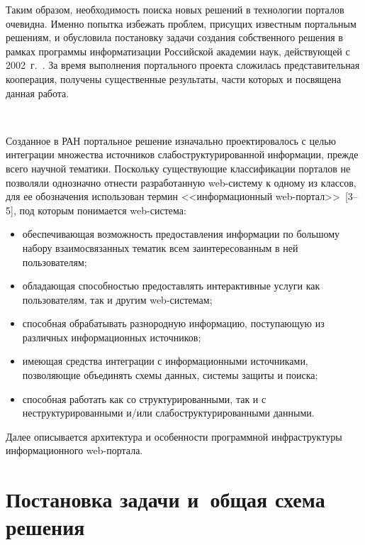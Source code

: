 \begin{multicols}{2}
 Таким образом, необходимость поиска новых решений в технологии порталов
очевидна. Именно попытка избежать проблем, присущих известным портальным
решениям, и обусловила постановку задачи создания собственного решения в рамках
программы информатизации Российской академии наук, действующей с
2002~г.~\cite{3bos}. За время выполнения портального проекта сложилась
представительная кооперация, получены существенные результаты, части которых и
посвящена данная работа.

 \begin{figure*} %
 \vspace*{1pt}
\begin{center}
\mbox{%
\epsfxsize=158.529mm
}
\end{center}
\vspace*{-9pt}
 \end{figure*}

 Созданное в РАН портальное решение изна\-чаль\-но проектировалось с целью
интеграции мно\-же\-ст\-ва источников слабоструктурированной ин\-фор\-ма\-ции, 
прежде всего научной тематики. Посколь\-ку существующие классификации порталов 
не позволяли однозначно отнести разработанную web-систему к одному из классов, 
для ее обозначения
использован термин <<информационный web-портал>>~[3--5], %
под которым понимается web-сис\-тема:
 \begin{itemize}
\item обеспечивающая возможность предоставления информации по большому
набору взаимосвязанных тематик всем заинтересованным в ней пользователям;
\item обладающая способностью предоставлять интерактивные услуги как
пользователям, так и другим web-системам;
\item способная обрабатывать разнородную информацию, поступающую из
различных информационных источников;
\item имеющая средства интеграции с информационными источниками,
позволяющие объединять схемы данных, системы защиты и поиска;
\item способная работать как со структурированными, так и с
неструктурированными и/или слабоструктурированными данными.
\end{itemize}


 Далее описывается архитектура и особенности программной инфраструктуры
информационного web-портала.

\section{Постановка задачи и~общая схема решения}


\end{multicols}
